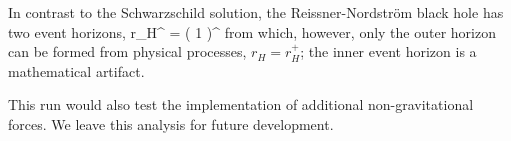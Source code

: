 In contrast to the Schwarzschild solution, the Reissner-Nordstr\"{o}m black hole has two event horizons,
\be
	r_{H}^{\pm} = \left( 1 \pm {} \right)^{}
\ee
from which, however, only the outer horizon can be formed from physical processes, $r_{H} = r_{H}^{+}$; the inner event horizon is a mathematical artifact.

This run would also test the implementation of additional non-gravitational forces. We leave this analysis for future development.
